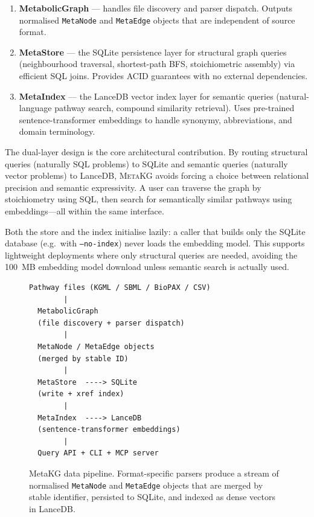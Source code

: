 \documentclass[10pt]{article}
\begin{document}
\begin{enumerate}[leftmargin=*]
  \item \textbf{MetabolicGraph} --- handles file discovery and parser
    dispatch. Outputs normalised \texttt{MetaNode} and \texttt{MetaEdge}
    objects that are independent of source format.
  \item \textbf{MetaStore} --- the SQLite persistence layer for structural
    graph queries (neighbourhood traversal, shortest-path BFS, stoichiometric
    assembly) via efficient SQL joins. Provides ACID guarantees with no
    external dependencies.
  \item \textbf{MetaIndex} --- the LanceDB vector index layer for semantic
    queries (natural-language pathway search, compound similarity retrieval).
    Uses pre-trained sentence-transformer embeddings to handle synonymy,
    abbreviations, and domain terminology.
\end{enumerate}

The dual-layer design is the core architectural contribution. By routing
structural queries (naturally SQL problems) to SQLite and semantic queries
(naturally vector problems) to LanceDB, \textsc{MetaKG} avoids forcing a
choice between relational precision and semantic expressivity. A user can
traverse the graph by stoichiometry using SQL, then search for semantically
similar pathways using embeddings---all within the same interface.

Both the store and the index initialise lazily: a caller that builds only the
SQLite database (e.g.\ with \texttt{--no-index}) never loads the embedding
model. This supports lightweight deployments where only structural queries are
needed, avoiding the 100~MB embedding model download unless semantic search is
actually used.

\begin{figure}[H]
  \centering
  \begin{lstlisting}[style=bash, frame=single, caption={High-level data flow.}]
Pathway files (KGML / SBML / BioPAX / CSV)
        |
  MetabolicGraph
  (file discovery + parser dispatch)
        |
  MetaNode / MetaEdge objects
  (merged by stable ID)
        |
  MetaStore  ----> SQLite
  (write + xref index)
        |
  MetaIndex  ----> LanceDB
  (sentence-transformer embeddings)
        |
  Query API + CLI + MCP server
  \end{lstlisting}
  \caption{MetaKG data pipeline. Format-specific parsers produce a stream of
  normalised \texttt{MetaNode} and \texttt{MetaEdge} objects that are merged
  by stable identifier, persisted to SQLite, and indexed as dense vectors in
  LanceDB.}
  \label{fig:arch}
\end{figure}
\end{document}
